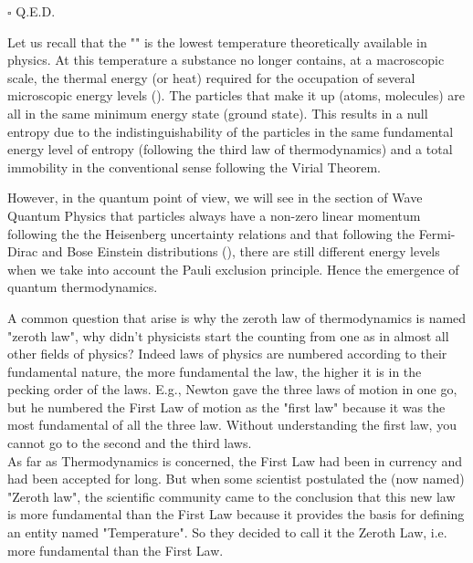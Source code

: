 \begin{enumerate}
\begin{dem}
		\begin{flushright}
			$\square$  Q.E.D.
		\end{flushright}
		\end{dem}
		Let us recall that the "" is the lowest temperature theoretically available in physics. At this temperature a substance no longer contains, at a macroscopic scale, the thermal energy (or heat) required for the occupation of several microscopic energy levels (). The particles that make it up (atoms, molecules) are all in the same minimum energy state (ground state). This results in a null entropy due to the indistinguishability of the particles in the same fundamental energy level of entropy (following the third law of thermodynamics) and a total immobility in the conventional sense following the Virial Theorem.
		
		However, in the quantum point of view, we will see in the section of Wave Quantum Physics that particles always have a non-zero linear momentum following the the Heisenberg uncertainty relations and that following the Fermi-Dirac and Bose Einstein distributions (), there are still different energy levels when we take into account the Pauli exclusion principle. Hence the emergence of quantum thermodynamics.		
	\end{enumerate}
	\begin{tcolorbox}[title=Remark,colframe=black,arc=10pt]
	A common question that arise is why the zeroth law of thermodynamics is named "zeroth law", why didn't physicists start the counting from one as in almost all other fields of physics? Indeed laws of physics are numbered according to their fundamental nature, the more fundamental the law, the higher it is in the pecking order of the laws. E.g., Newton gave the three laws of motion in one go, but he numbered the First Law of motion as the "first law" because it was the most fundamental of all the three law. Without understanding the first law, you cannot go to the second and the third laws.\\

	As far as Thermodynamics is concerned, the First Law had been in currency and had been accepted for long. But when some scientist postulated the (now named) "Zeroth law", the scientific community came to the conclusion that this new law is more fundamental than the First Law because it provides the basis for defining an entity named "Temperature". So they decided to call it the Zeroth Law, i.e. more fundamental than the First Law.
	\end{tcolorbox}
	
